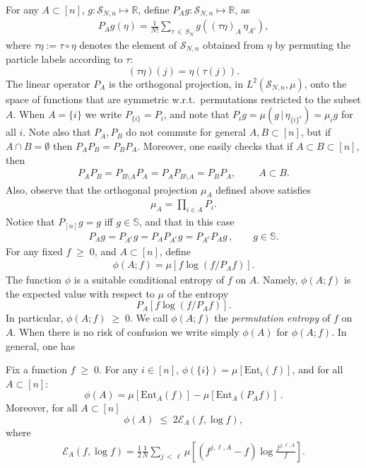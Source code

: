 \documentclass[AHL,Unicode,longabstracts,published]{cedram}
\renewcommand{\leq}{\;\leqslant\;}
\renewcommand{\geq}{\;\geqslant\;}
\newcommand{\tc}{\, |\, }
\newcommand{\ent}{\mathrm{Ent}}
\newcommand{\cE}{\mathcal{E}}
\newcommand{\cS}{\mathcal{S}}
\newcommand{\bbR}{\mathbb{R}}
\newcommand{\bbS}{\mathbb{S}}
\let\t=\tau
\begin{document}
For any $A\subset [n]$, $g:\cS_{N,n}\mapsto\bbR$, define $P_Ag:\cS_{N,n}\mapsto \bbR$, as
\begin{align}\label{defpA}
P_Ag(\eta) = \frac1{N!}\sum_{\t\,\in\,S_N}g((\t\eta)_A\,\eta_{A^c}),
\end{align}
where $\t\eta:=\t\circ\eta$ denotes the element of $\cS_{N,n}$ obtained from $\eta$ by permuting the particle labels according to $\t$:
\[
(\t\eta)(j) = \eta(\t(j)).
\]
The linear operator $P_A$ is the orthogonal projection, in $L^2(\cS_{N,n},\mu)$, onto the space of functions that are symmetric w.r.t.\ permutations restricted to the subset $A$. When $A=\{i\}$ we write $P_{\{i\}}=P_i$, and note that $P_{i}g = \mu(g\tc \eta_{\{i\}^c})=\mu_i g$ for all $i$. Note also that $P_A,P_B$ do not commute for general $A,B\subset[n]$, but if $A\cap B=\emptyset$ then $P_AP_B=P_BP_A$. Moreover, one easily checks that if $A\subset B\subset [n]$, then
\begin{align}\label{commPA}
P_AP_B = P_{B\setminus A}P_A = P_AP_{B\setminus A}=P_BP_A,\qquad \;A\subset B.
\end{align}
Also, observe that the orthogonal projection $\mu_A$ defined above satisfies
\begin{align}\label{muAPA}
\mu_A = \prod_{i\in A}P_i.
\end{align}
Notice that $P_{[n]}g = g$ iff $g\in\bbS$, and that in this case
\begin{align}\label{enta+7}
P_Ag = P_{A^c}g = P_AP_{A^c}g=P_{A^c}P_{A}g\,,\qquad g\in\bbS.
\end{align}
For any fixed $f\geq 0$, and $A\subset[n]$, define
\begin{align}\label{phia}
\phi(A;f) = \mu\left[f\log(f/P_Af)
\right].
\end{align}
The function $\phi$ is a suitable conditional entropy of $f$ on $A$. Namely, $\phi(A;f)$ is the expected value with respect to $\mu$ of the entropy
\[
P_A\left[f\log(f/P_Af)\right].
\]
In particular, $\phi(A;f) \geq 0$. We call $\phi(A;f) $ the \emph{permutation entropy} of $f$ on $A$. When there is no risk of confusion we write simply $\phi(A)$ for $\phi(A;f)$. In general, one has

\begin{lemm}
\label{propphiA}
Fix a function $f\geq 0$. For any $i\in[n]$, $\phi(\{i\}) = \mu[\ent_i(f)]$, and for all $A\subset[n]$:
\begin{equation}\label{phia2}
\phi(A) = \mu\left[\ent_A(f) \right] - \mu\left[\ent_A(P_Af) \right] \,.
\end{equation}
Moreover, for all $A\subset[n]$
\begin{equation}\label{phiaGQ}
\phi(A) \leq 2\cE_A(f,\log f),
\end{equation}
where
\begin{align}\label{enta+5}
\cE_A(f,\log f)=\frac12\frac1N\sum_{j\,<\,\ell}\mu\left[\left(f^{j,\ell,A} - f\right)
\log \frac{f^{j,\ell,A}}{f}
\right].
\end{align}
\end{lemm}
\end{document}

